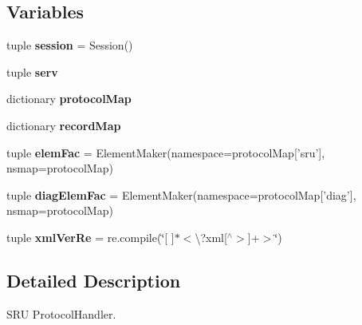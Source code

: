 \subsection*{Variables}
\begin{DoxyCompactItemize}
\item 
\hypertarget{namespacecheshire3_1_1web_1_1sru_handler_aa28351d7a4f386e91d20c5f32f2e4f79}{tuple {\bfseries session} = Session()}\label{namespacecheshire3_1_1web_1_1sru_handler_aa28351d7a4f386e91d20c5f32f2e4f79}

\item 
tuple {\bfseries serv}
\item 
dictionary {\bfseries protocol\-Map}
\item 
dictionary {\bfseries record\-Map}
\item 
\hypertarget{namespacecheshire3_1_1web_1_1sru_handler_a8ce041a602245c67ba8fce1f167d116a}{tuple {\bfseries elem\-Fac} = Element\-Maker(namespace=protocol\-Map\mbox{[}'sru'\mbox{]}, nsmap=protocol\-Map)}\label{namespacecheshire3_1_1web_1_1sru_handler_a8ce041a602245c67ba8fce1f167d116a}

\item 
\hypertarget{namespacecheshire3_1_1web_1_1sru_handler_ae0e2211512947c3176460e16035d1ce6}{tuple {\bfseries diag\-Elem\-Fac} = Element\-Maker(namespace=protocol\-Map\mbox{[}'diag'\mbox{]}, nsmap=protocol\-Map)}\label{namespacecheshire3_1_1web_1_1sru_handler_ae0e2211512947c3176460e16035d1ce6}

\item 
\hypertarget{namespacecheshire3_1_1web_1_1sru_handler_a3f2b9b881eb418d6d4e18e50261689bb}{tuple {\bfseries xml\-Ver\-Re} = re.\-compile(\char`\"{}\mbox{[} \mbox{]}$\ast$$<$\textbackslash{}?xml\mbox{[}$^\wedge$$>$\mbox{]}+$>$\char`\"{})}\label{namespacecheshire3_1_1web_1_1sru_handler_a3f2b9b881eb418d6d4e18e50261689bb}

\end{DoxyCompactItemize}


\subsection{Detailed Description}
\begin{DoxyVerb}SRU ProtocolHandler.\end{DoxyVerb}
 

